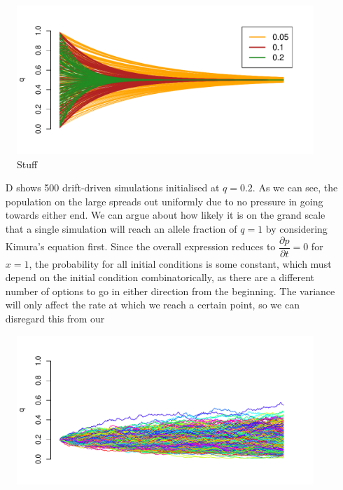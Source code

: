 \documentclass[10pt]{article}\usepackage[]{graphicx}\usepackage[]{color}
\makeatletter
\def\maxwidth{ %
  \ifdim\Gin@nat@width>\linewidth
    \linewidth
  \else
    \Gin@nat@width
  \fi
}
\theoremstyle{plain}
\makeatother
\begin{document}
\begin{multicols*}{2}
\begin{Schunk}
\begin{figure}[H]
{\centering \includegraphics[width=\maxwidth]{figure/twocolumn-stochc-1} 

}

\caption[Stuff]{Stuff}\label{fig:stochc}
\end{figure}
\end{Schunk}
\begin{enumerate}
  \item[D]  shows 500 drift-driven simulations initialised at $q = 0.2$. As we can see, the population on the large spreads out uniformly due to no pressure in going towards either end. We can argue about how likely it is on the grand scale that a single simulation will reach an allele fraction of $q = 1$ by considering Kimura's equation first. Since the overall expression reduces to $\dfrac{\partial p}{\partial t} = 0$ for $x = 1$, the probability for all initial conditions is some constant, which must depend on the initial condition combinatorically, as there are a different number of options to go in either direction from the beginning. The variance will only affect the rate at which we reach a certain point, so we can disregard this from our 
\end{enumerate}
\begin{Schunk}
\begin{figure}[H]

{\centering \includegraphics[width=\maxwidth]{figure/twocolumn-stochd-1} 

}
\end{figure}
\end{Schunk}
\end{multicols*}
\end{document}
